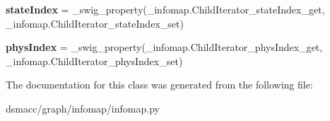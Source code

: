\begin{DoxyCompactItemize}
\item 
\mbox{\label{classdsmacc_1_1graph_1_1infomap_1_1infomap_1_1ChildIterator_a8723fc8f72aca70c77b38933549b3e81}} 
{\bfseries state\+Index} = \+\_\+swig\+\_\+property(\+\_\+infomap.\+Child\+Iterator\+\_\+state\+Index\+\_\+get, \+\_\+infomap.\+Child\+Iterator\+\_\+state\+Index\+\_\+set)
\item 
\mbox{\label{classdsmacc_1_1graph_1_1infomap_1_1infomap_1_1ChildIterator_aae52aea61209020a986d6408a234963d}} 
{\bfseries phys\+Index} = \+\_\+swig\+\_\+property(\+\_\+infomap.\+Child\+Iterator\+\_\+phys\+Index\+\_\+get, \+\_\+infomap.\+Child\+Iterator\+\_\+phys\+Index\+\_\+set)
\end{DoxyCompactItemize}


The documentation for this class was generated from the following file\+:\begin{DoxyCompactItemize}
\item 
dsmacc/graph/infomap/infomap.\+py\end{DoxyCompactItemize}
